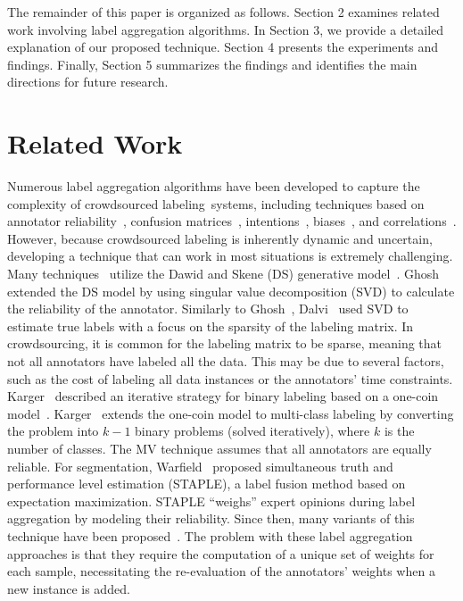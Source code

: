 \documentclass[pdflatex,bst/sn-basic]{bst/sn-jnl}%
\begin{document}
The remainder of this paper is organized as follows. Section 2 examines related work involving label aggregation algorithms. In Section 3, we provide a detailed explanation of our proposed technique. Section 4 presents the experiments and findings. Finally, Section 5 summarizes the findings and identifies the main directions for future research.

\section{Related Work}
Numerous label aggregation algorithms have been developed to capture the complexity of crowdsourced labeling~systems, including techniques based on annotator reliability~\cite{bi_Learning_2014,demartini_Zencrowd_2012}, confusion matrices~\cite{raykar_Learning_2010,zhang_Spectral_2014}, intentions~\cite{bi_Learning_2014,kurve_MultiCategory_2015}, biases~\cite{zhang_Imbalanced_2013,hernandez-gonzalez_Note_2019, welinder_Multidimensional_2010}, and correlations~\cite{ma_Gradient_2020}. However, because crowdsourced labeling is inherently dynamic and uncertain, developing a technique that can work in most situations is extremely challenging. Many techniques~\cite{liu_Variational_2012,karger_Budget_2014,raykar_Learning_2010,dalvi_Aggregating_2013,ghosh_Who_2011} utilize the Dawid and Skene (DS) generative model~\cite{dawid_Maximum_1979}. Ghosh~\cite{ghosh_Who_2011} extended the DS model by using singular value decomposition (SVD) to calculate the reliability of the annotator. Similarly to Ghosh~\cite{ghosh_Who_2011}, Dalvi~\cite{dalvi_Aggregating_2013} used SVD to estimate true labels with a focus on the sparsity of the labeling matrix. In crowdsourcing, it is common for the labeling matrix to be sparse, meaning that not all annotators have labeled all the data. This may be due to several factors, such as the cost of labeling all data instances or the annotators' time constraints. Karger~\cite{karger_Budget_2014} described an iterative strategy for binary labeling based on a one-coin model~\cite{ghosh_Who_2011}. Karger~\cite{karger_Budget_2014} extends the one-coin model to multi-class labeling by converting the problem into $k-1 $ binary problems (solved iteratively), where $k $ is the number of classes.
The MV technique assumes that all annotators are equally reliable. For segmentation, Warfield~\cite{warfield_Simultaneous_2004} proposed simultaneous truth and performance level estimation (STAPLE), a label fusion method based on expectation maximization. STAPLE ``weighs'' expert opinions during label aggregation by modeling their reliability. Since then, many variants of this technique have been proposed~\cite{winzeck_ISLES_2018,commowick_Objective_2018,asman_Robust_2011,asman_Formulating_2012, eugenioiglesias_Unified_2013, jorgecardoso_STEPS_2013,asman_NonLocal_2013,akhondi-asl_Logarithmic_2014}. The problem with these label aggregation approaches is that they require the computation of a unique set of weights for each sample, necessitating the re-evaluation of the annotators' weights when a new instance is added.
\end{document}
